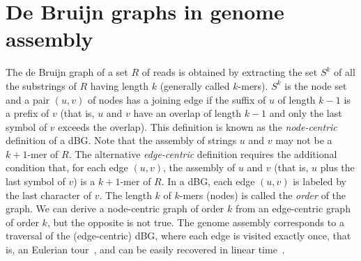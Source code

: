 \documentclass[11pt,oneside,a4paper]{article}
\begin{document}


\section{De Bruijn graphs in genome assembly}
\label{sec:DBG}

The de Bruijn graph of a set $R$ of reads is
obtained by extracting the set $S^k$ of all the substrings of $R$ having length $k$ (generally called $k$-mers).
$S^k$ is the node set and a pair $(u,v)$ of nodes has a joining edge if the suffix of $u$ of length $k-1$ is a
prefix of $v$ (that is, $u$ and $v$ have an overlap of length $k-1$ and only the last symbol of $v$ exceeds the overlap).
This definition is known as the \emph{node-centric} definition of a dBG.
Note that the assembly of strings $u$ and $v$ may not be a $k+1$-mer of $R$.
The alternative \emph{edge-centric} definition requires the additional condition that, for each edge $(u,v)$, the assembly of $u$ and $v$ (that is, $u$ plus the last symbol of $v$) is a $k+1$-mer of $R$.
In a dBG, each edge $(u,v)$ is labeled by the last character of $v$.
The length $k$ of $k$-mers (nodes) is called the \emph{order} of the graph. We can derive a 
node-centric graph of order $k$ from an edge-centric graph of order $k$, but the opposite is not true. The genome assembly corresponds to a traversal of the (edge-centric) dBG, where each edge is visited exactly once, that is, an Eulerian tour~\cite{Pevzner14082001}, and can be easily recovered in linear time~\cite{jones_introduction_2004}.
\end{document}
